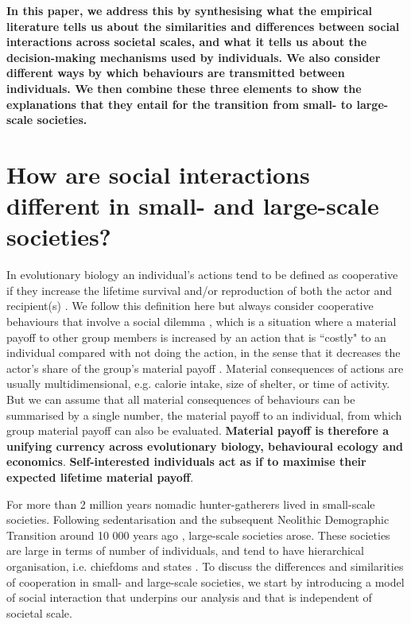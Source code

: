 \documentclass[10pt, a4paper, fleqn]{article}
\begin{document}
\textbf{In this paper, we address this by synthesising what the empirical literature tells us about the similarities and differences between social interactions across societal scales, and what it tells us about the decision-making mechanisms used by individuals. We also consider different ways by which behaviours are transmitted between individuals. We then combine these three elements to show the explanations that they entail for the transition from small- to large-scale societies.}

\section*{How are social interactions different in small- and large-scale societies?}

In evolutionary biology an individual's actions tend to be defined as cooperative if they increase the lifetime survival and/or reproduction of both the actor and recipient(s) \citep{Axelrod:1981:a,Rousset:2004:a,lehmannKellerFramework,Bshary07}. We follow this definition here but always consider cooperative behaviours that involve a social dilemma \citep{Kollock:1998:a}, which is a situation where a material payoff to other group members is increased by an action that is ``costly" to an individual compared with not doing the action, in the sense that it decreases the actor's share of the group's material payoff \citep{Dawes:1980:a}. Material consequences of actions are usually multidimensional, e.g. calorie intake, size of shelter, or time of activity. But we can assume that all material consequences of behaviours can be summarised by a single number, the material payoff to an individual, from which group material payoff can also be evaluated. \textbf{Material payoff is therefore a unifying currency across evolutionary biology, behavioural ecology and economics}. \textbf{Self-interested individuals act as if to maximise their expected lifetime material payoff}.

For more than 2 million years nomadic hunter-gatherers lived in small-scale societies. Following sedentarisation and the subsequent Neolithic Demographic Transition around 10 000 years ago \citep{Bocquet-Appel:2011:a}, large-scale societies arose. These societies are large in terms of number of individuals, and tend to have hierarchical organisation, i.e. chiefdoms and states \citep{Johnson:2000:a}. To discuss the differences and similarities of cooperation in small- and large-scale societies, we start by introducing a model of social interaction that underpins our analysis and that is independent of societal scale. 
\end{document}

